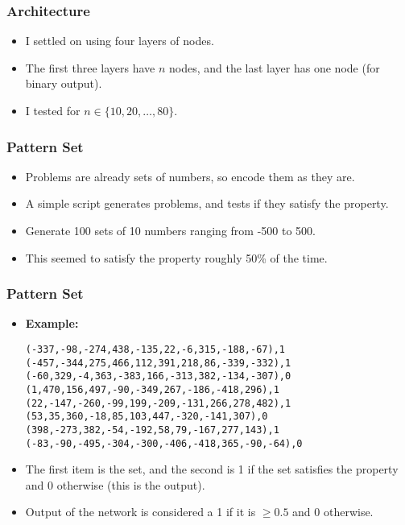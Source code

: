 \documentclass{beamer}
\numberwithin{equation}{section} %
\begin{document}
\begin{frame}
    \frametitle{Architecture}
    \begin{itemize}
        \item I settled on using four layers of nodes.
        \pause
        \item The first three layers have $n$ nodes, and the last layer has one node (for binary output).
        \pause
        \item I tested for $n\in\{10, 20, \ldots, 80\}$.
    \end{itemize}
\end{frame}

\begin{frame}
    \frametitle{Pattern Set}
    \begin{itemize}
        \item Problems are already sets of numbers, so encode them as they are.
        \pause
        \item A simple script generates problems, and tests if they satisfy the property.
        \pause
        \item Generate 100 sets of 10 numbers ranging from -500 to 500.
        \pause
        \item This seemed to satisfy the property roughly 50\% of the time.
    \end{itemize}
\end{frame}

\begin{frame}
    \frametitle{Pattern Set}
    \begin{itemize}
        \item \textbf{Example:}
        \footnotesize
        \begin{alltt}
        (-337, -98, -274, 438, -135, 22, -6, 315, -188, -67), 1\\
        (-457, -344, 275, 466, 112, 391, 218, 86, -339, -332), 1\\
        (-60, 329, -4, 363, -383, 166, -313, 382, -134, -307), 0\\
        (1, 470, 156, 497, -90, -349, 267, -186, -418, 296), 1\\
        (22, -147, -260, -99, 199, -209, -131, 266, 278, 482), 1\\
        (53, 35, 360, -18, 85, 103, 447, -320, -141, 307), 0\\
        (398, -273, 382, -54, -192, 58, 79, -167, 277, 143), 1\\
        (-83, -90, -495, -304, -300, -406, -418, 365, -90, -64), 0
        \end{alltt}
        \normalsize
        \item The first item is the set, and the second is 1 if the set satisfies the property and 0 otherwise (this is the output).
        \pause
        \item Output of the network is considered a 1 if it is $\geq 0.5$ and 0 otherwise.
    \end{itemize}
\end{frame}
\end{document}

